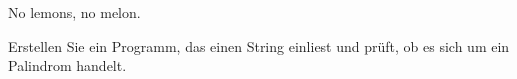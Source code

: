 \begin{frame}[fragile]{No lemons, no melon.}\onslide<+->%
    \begin{exercise}
        Erstellen Sie ein Programm, das einen String einliest und prüft, ob es sich um ein Palindrom handelt.
    \end{exercise}
    \begin{solve}
        \scriptsize%
    \end{solve}
\end{frame}